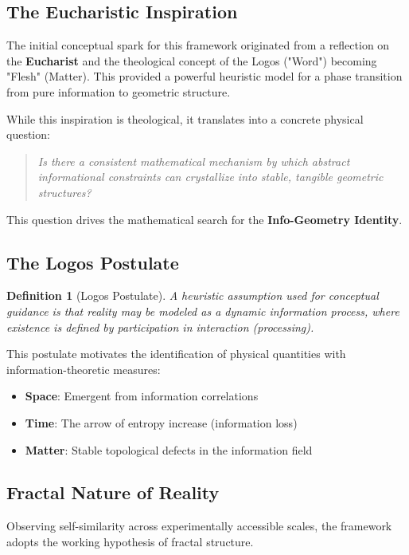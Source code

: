 \documentclass[11pt,a4paper]{book}
\newtheorem{definition}{Definition}[section]
\theoremstyle{remark}
\begin{document}
\subsection{The Eucharistic Inspiration}

The initial conceptual spark for this framework originated from a reflection on the \textbf{Eucharist} and the theological concept of the Logos ("Word") becoming "Flesh" (Matter). This provided a powerful heuristic model for a phase transition from pure information to geometric structure.

While this inspiration is theological, it translates into a concrete physical question:
\begin{quote}
\textit{Is there a consistent mathematical mechanism by which abstract informational constraints can crystallize into stable, tangible geometric structures?}
\end{quote}

This question drives the mathematical search for the \textbf{Info-Geometry Identity}.

\subsection{The Logos Postulate}

\begin{definition}[Logos Postulate]
A heuristic assumption used for conceptual guidance is that reality may be modeled as a dynamic information process, where existence is defined by participation in interaction (processing).
\end{definition}

This postulate motivates the identification of physical quantities with information-theoretic measures:
\begin{itemize}
    \item \textbf{Space}: Emergent from information correlations
    \item \textbf{Time}: The arrow of entropy increase (information loss)
    \item \textbf{Matter}: Stable topological defects in the information field
\end{itemize}

\subsection{Fractal Nature of Reality}

Observing self-similarity across experimentally accessible scales, the framework adopts the working hypothesis of fractal structure.
\end{document}
